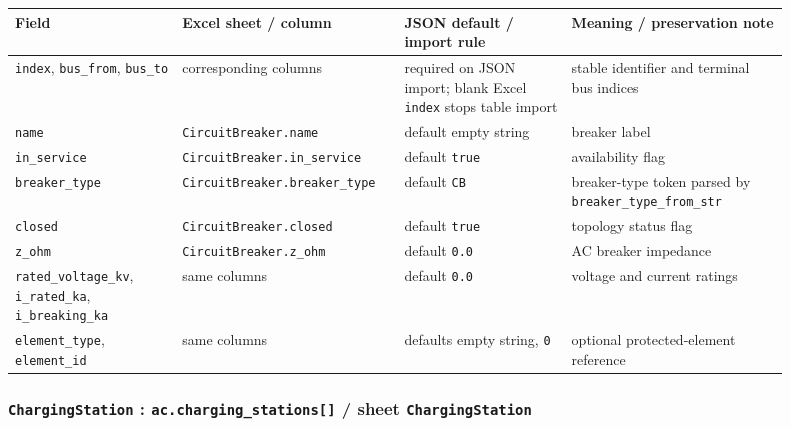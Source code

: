 \begin{longtable}{L{0.20\linewidth}L{0.24\linewidth}L{0.20\linewidth}L{0.26\linewidth}}
\toprule
Field & Excel sheet / column & JSON default / import rule & Meaning / preservation note \\
\midrule
\endhead
\texttt{index}, \texttt{bus\_from}, \texttt{bus\_to} & corresponding columns & required on JSON import; blank Excel \texttt{index} stops table import & stable identifier and terminal bus indices \\
\texttt{name} & \texttt{CircuitBreaker.name} & default empty string & breaker label \\
\texttt{in\_service} & \texttt{CircuitBreaker.in\_service} & default \texttt{true} & availability flag \\
\texttt{breaker\_type} & \texttt{CircuitBreaker.breaker\_type} & default \texttt{CB} & breaker-type token parsed by \texttt{breaker\_type\_from\_str} \\
\texttt{closed} & \texttt{CircuitBreaker.closed} & default \texttt{true} & topology status flag \\
\texttt{z\_ohm} & \texttt{CircuitBreaker.z\_ohm} & default \texttt{0.0} & AC breaker impedance \\
\texttt{rated\_voltage\_kv}, \texttt{i\_rated\_ka}, \texttt{i\_breaking\_ka} & same columns & default \texttt{0.0} & voltage and current ratings \\
\texttt{element\_type}, \texttt{element\_id} & same columns & defaults empty string, \texttt{0} & optional protected-element reference \\
\bottomrule
\end{longtable}

\subsubsection*{\texttt{ChargingStation} : \texttt{ac.charging\_stations[]} / sheet \texttt{ChargingStation}}

